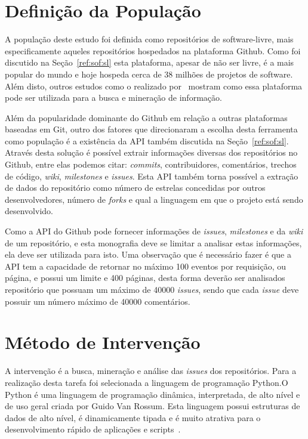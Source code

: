 \section{Definição da População}
\label{met:def}
A população deste estudo foi definida como repositórios de software-livre, mais especificamente aqueles repositórios hospedados na plataforma Github. Como foi discutido na Seção~\ref{ref:sof:sl} esta plataforma, apesar de não ser livre, é a mais popular do mundo e hoje hospeda cerca de 38 milhões de projetos de software. Além disto, outros estudos como o realizado por~ mostram como essa plataforma pode ser utilizada para a busca e mineração de informação.

Além da popularidade dominante do Github em relação a outras plataformas baseadas em Git, outro dos fatores que direcionaram a escolha desta ferramenta como população é a existência da API também discutida na Seção~\ref{ref:sof:sl}. Através desta solução é possível extrair informações diversas dos repositórios no Github, entre elas podemos citar: \textit{commits}, contribuidores, comentários, trechos de código, \textit{wiki}, \textit{milestones} e \textit{issues}. Esta API também torna possível a extração de dados do repositório como número de estrelas concedidas por outros desenvolvedores, número de \textit{forks} e qual a linguagem em que o projeto está sendo desenvolvido.

Como a API do Github pode fornecer informações de \textit{issues}, \textit{milestones} e da \textit{wiki} de um repositório, e esta monografia deve se limitar a analisar estas informações, ela deve ser utilizada para isto. Uma observação que é necessário fazer é que a API tem a capacidade de retornar no máximo 100 eventos por requisição, ou página, e possui um limite e 400 páginas, desta forma deverão ser analisados repositório que possuam um máximo de 40000 \textit{issues}, sendo que cada \textit{issue} deve possuir um número máximo de 40000 comentários.

\section{Método de Intervenção}
\label{met:int}
A intervenção é a busca, mineração e análise das \textit{issues} dos repositórios. Para a realização desta tarefa foi selecionada a linguagem de programação Python.O Python é uma linguagem de programação dinâmica, interpretada, de alto nível e de  uso geral criada por Guido Van Rossum. Esta linguagem possui estruturas de dados de alto nível, é dinamicamente tipada e é muito atrativa para o desenvolvimento rápido de aplicações e scripts~\cite{python}.

